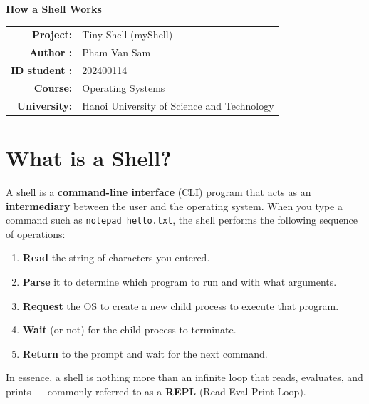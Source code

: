 \documentclass[12pt,a4paper]{article}
\begin{document}
\begin{center}
    {\color{darkblue}\LARGE\bfseries How a Shell Works}\\[0.2cm]
    \begin{tabular}{rl}
        \textbf{Project:} & Tiny Shell (myShell) \\
        \textbf{Author :} & Pham Van Sam \\ 
        \textbf{ID student :} & 202400114 \\ 
        \textbf{Course:} & Operating Systems \\
        \textbf{University:} & Hanoi University of Science and Technology \\
    \end{tabular}
\end{center}

\tableofcontents
\newpage

\section{What is a Shell?}

A shell is a \textbf{command-line interface} (CLI) program that acts as an \textbf{intermediary} between the user and the operating system. When you type a command such as \texttt{notepad hello.txt}, the shell performs the following sequence of operations:

\begin{enumerate}
    \item \textbf{Read} the string of characters you entered.
    \item \textbf{Parse} it to determine which program to run and with what arguments.
    \item \textbf{Request} the OS to create a new child process to execute that program.
    \item \textbf{Wait} (or not) for the child process to terminate.
    \item \textbf{Return} to the prompt and wait for the next command.
\end{enumerate}

In essence, a shell is nothing more than an infinite loop that reads, evaluates, and prints --- commonly referred to as a \textbf{REPL} (Read-Eval-Print Loop).

\end{document}
